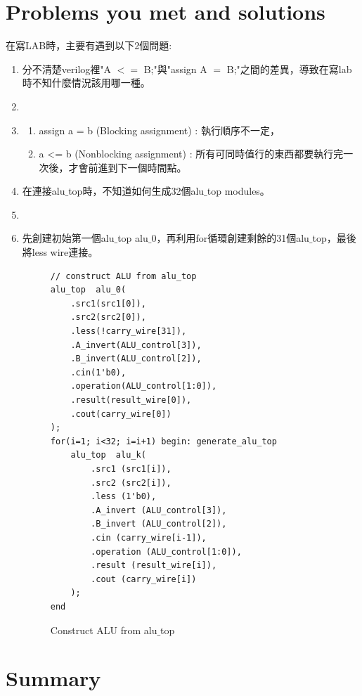 \documentclass[12pt,a4paper]{article}
\makeatletter
\newtheorem*{solution}{Solution}
\theoremstyle{definition}
\renewenvironment{solution}[1][Solution] {\par\pushQED{\qed}\normalfont\topsep6\p@\@plus6\p@\relax\trivlist\item[\hskip\labelsep\bfseries#1\@addpunct{.}]\ignorespaces}{\popQED\endtrivlist\@endpefalse} \makeatother
\makeatother
\begin{document}
\section{Problems you met and solutions}

在寫LAB時，主要有遇到以下2個問題:
\begin{enumerate}
\item 分不清楚verilog裡"A $<=$ B;"與"assign A $=$ B;"之間的差異，導致在寫lab時不知什麼情況該用哪一種。
\begin{solution}
\item
\begin{enumerate}
\item assign a = b (Blocking assignment) : 執行順序不一定，
\item a <= b (Nonblocking assignment) : 所有可同時值行的東西都要執行完一次後，才會前進到下一個時間點。
\end{enumerate}
\end{solution}

\item 在連接alu$\_$top時，不知道如何生成32個alu$\_$top modules。
\begin{solution}
\item 先創建初始第一個alu$\_$top alu$\_$0，再利用for循環創建剩餘的31個alu$\_$top，最後將less wire連接。

\begin{figure}[H]
\centering
\begin{lstlisting}[caption={}]
// construct ALU from alu_top
alu_top  alu_0(
    .src1(src1[0]),
    .src2(src2[0]),
    .less(!carry_wire[31]),
    .A_invert(ALU_control[3]),
    .B_invert(ALU_control[2]),
    .cin(1'b0),
    .operation(ALU_control[1:0]),
    .result(result_wire[0]),
    .cout(carry_wire[0])
);
for(i=1; i<32; i=i+1) begin: generate_alu_top
    alu_top  alu_k(
        .src1 (src1[i]),
        .src2 (src2[i]),
        .less (1'b0),
        .A_invert (ALU_control[3]),
        .B_invert (ALU_control[2]),
        .cin (carry_wire[i-1]),
        .operation (ALU_control[1:0]),
        .result (result_wire[i]),
        .cout (carry_wire[i])
    );
end
\end{lstlisting}
\caption{Construct ALU from alu$\_$top}
\label{fig:construct}
\end{figure}
\end{solution}

\end{enumerate}

\section{Summary}
\end{document}
